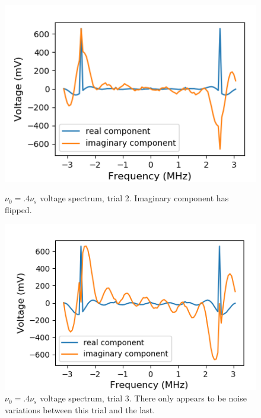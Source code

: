 \documentclass[a4paper]{article}
\begin{document}
\begin{figure}
\centering
\begin{minipage}{.5\textwidth}
	\centering
	\includegraphics[width=.8\linewidth]{5-3/volt2}
	\caption{$\nu_0 = .4\nu_s$ voltage spectrum, \hfill \break trial 2. Imaginary component has flipped.}
	\label{fig:Volt2}
\end{minipage}%
\begin{minipage}{.5\textwidth}
	\centering
	\includegraphics[width=.8\linewidth]{5-3/volt3}
	\caption{$\nu_0 = .4\nu_s$ voltage spectrum, \hfill \break trial 3. There only appears to be noise variations \hfill \break between this trial and the last.}
	\label{fig:Volt3}
\end{minipage}
\end{figure}
\end{document}
